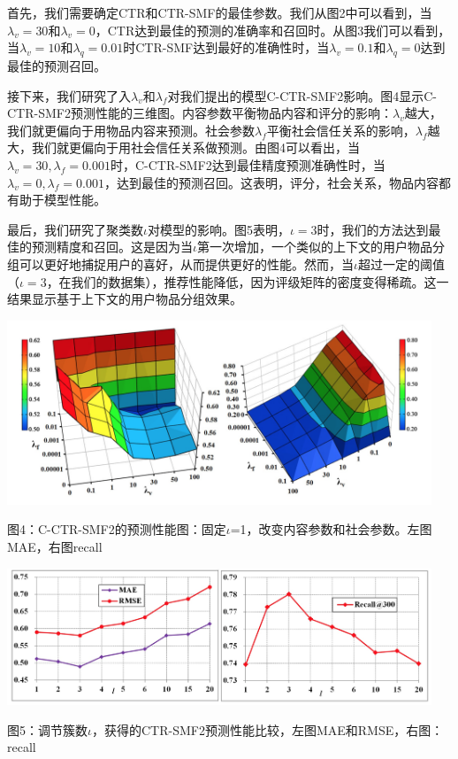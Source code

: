 \documentclass[10pt,a4paper]{article}
\theoremstyle{mythm}%
\numberwithin{equation}{section}
\begin{document}
首先，我们需要确定CTR和CTR-SMF的最佳参数。我们从图2中可以看到，当$\lambda_v = 30$和$\lambda_v = 0$，CTR达到最佳的预测的准确率和召回时。从图3我们可以看到，当$\lambda_v = 10$和$\lambda_q = 0.01$时CTR-SMF达到最好的准确性时，当$\lambda_v = 0.1$和$\lambda_q = 0$达到最佳的预测召回。

接下来，我们研究了入$\lambda_v $和$\lambda_f$对我们提出的模型C-CTR-SMF2影响。图4显示C-CTR-SMF2预测性能的三维图。内容参数平衡物品内容和评分的影响：$\lambda_v $越大，我们就更偏向于用物品内容来预测。社会参数$\lambda_f$平衡社会信任关系的影响，$\lambda_f$越大，我们就更偏向于用社会信任关系做预测。由图4可以看出，当$\lambda_v = 30,\lambda_f = 0.001$时，C-CTR-SMF2达到最佳精度预测准确性时，当$\lambda_v = 0,\lambda_f = 0.001$，达到最佳的预测召回。这表明，评分，社会关系，物品内容都有助于模型性能。

最后，我们研究了聚类数$\iota$对模型的影响。图5表明，$\iota=3$时，我们的方法达到最佳的预测精度和召回。这是因为当$\iota$第一次增加，一个类似的上下文的用户物品分组可以更好地捕捉用户的喜好，从而提供更好的性能。然而，当$\iota$超过一定的阈值（$\iota=3$，在我们的数据集），推荐性能降低，因为评级矩阵的密度变得稀疏。这一结果显示基于上下文的用户物品分组效果。

\includegraphics[width=5in]{figure4.png} 

图4：C-CTR-SMF2的预测性能图：固定$\iota$=1，改变内容参数和社会参数。左图MAE，右图recall

\includegraphics[width=5in]{figure5.png} 

图5：调节簇数$\iota$，获得的CTR-SMF2预测性能比较，左图MAE和RMSE，右图：recall
\end{document}

